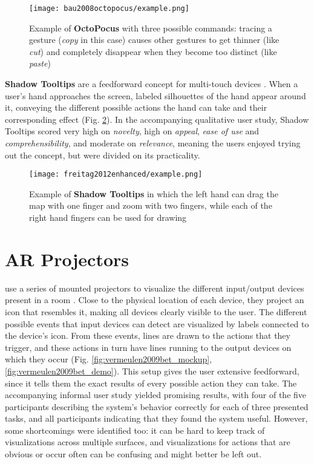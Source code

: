 \begin{figure}
    \centering
    \texttt{[image: bau2008octopocus/example.png]}
    \caption{Example of \textbf{OctoPocus} with three possible commands: tracing a gesture (\textit{copy} in this case) causes other gestures to get thinner (like \textit{cut}) and completely disappear when they become too distinct (like \textit{paste}) \cite{bau2008octopocus}}
    \label{fig:bau2008octopocus_demo}
\end{figure}

\textbf{Shadow Tooltips} are a feedforward concept for multi-touch devices \cite{freitag2012enhanced}. When a user's hand approaches the screen, labeled silhouettes of the hand appear around it, conveying the different possible actions the hand can take and their corresponding effect (Fig. \ref{fig:freitag2012enhanced_demo}). In the accompanying qualitative user study, Shadow Tooltips scored very high on \textit{novelty}, high on \textit{appeal}, \textit{ease of use} and \textit{comprehensibility}, and moderate on \textit{relevance}, meaning the users enjoyed trying out the concept, but were divided on its practicality.

\begin{figure}
    \centering
    \texttt{[image: freitag2012enhanced/example.png]}
    \caption{Example of \textbf{Shadow Tooltips} in which the left hand can drag the map with one finger and zoom with two fingers, while each of the right hand fingers can be used for drawing \cite{freitag2012enhanced}}
    \label{fig:freitag2012enhanced_demo}
\end{figure}

\section{AR Projectors} \label{sec:related_work:ar_projectors}
\textbf{\citeauthor{vermeulen2009bet}} use a series of mounted projectors to visualize the different input/output devices present in a room \cite{vermeulen2009bet}. Close to the physical location of each device, they project an icon that resembles it, making all devices clearly visible to the user. The different possible events that input devices can detect are visualized by labels connected to the device's icon. From these events, lines are drawn to the actions that they trigger, and these actions in turn have lines running to the output devices on which they occur (Fig. \ref{fig:vermeulen2009bet_mockup}, \ref{fig:vermeulen2009bet_demo}). This setup gives the user extensive feedforward, since it tells them the exact results of every possible action they can take. The accompanying informal user study yielded promising results, with four of the five participants describing the system's behavior correctly for each of three presented tasks, and all participants indicating that they found the system useful. However, some shortcomings were identified too: it can be hard to keep track of visualizations across multiple surfaces, and visualizations for actions that are obvious or occur often can be confusing and might better be left out.

